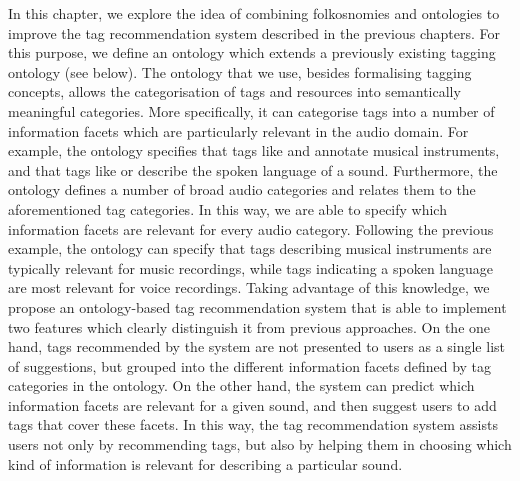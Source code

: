 In this chapter, we explore the idea of combining folkosnomies and ontologies to improve the tag recommendation system described in the previous chapters.
For this purpose, we define an ontology which extends a previously existing tagging ontology (see below).
The ontology that we use, besides formalising tagging concepts, allows the categorisation of tags and resources into semantically meaningful categories.
More specifically, it can categorise tags into a number of information facets which are particularly relevant in the audio domain. 
For example, the ontology specifies that tags like  and  annotate musical instruments, and that tags like  or  describe the spoken language of a sound. 
Furthermore, the ontology defines a number of broad audio categories and relates them to the aforementioned tag categories. In this way, we are able to specify which information facets are relevant for every audio category. Following the previous example, the ontology can specify that tags describing musical instruments are typically relevant for music recordings, while tags indicating a spoken language are most relevant for voice recordings.
Taking advantage of this knowledge, we propose an ontology-based tag recommendation system that is able to implement two features which clearly distinguish it from previous approaches. 
On the one hand, tags recommended by the system are not presented to users as a single list of suggestions, but grouped into the different information facets defined by tag categories in the ontology. 
On the other hand, the system can predict which information facets are relevant for a given sound, and then suggest users to add tags that cover these facets. In this way, the tag recommendation system assists users not only by recommending tags, but also by helping them in choosing which kind of information is relevant for describing a particular sound.

